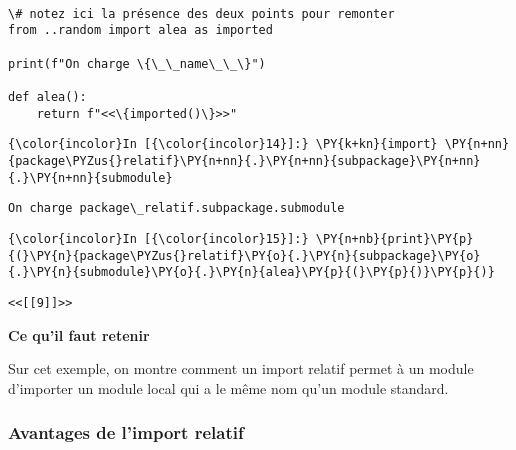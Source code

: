     \begin{Verbatim}[commandchars=\\\{\},frame=single,framerule=0.3mm,rulecolor=\color{cellframecolor}]

\# notez ici la présence des deux points pour remonter
from ..random import alea as imported

print(f"On charge \{\_\_name\_\_\}")

def alea():
    return f"<<\{imported()\}>>"
\end{Verbatim}

    \begin{Verbatim}[commandchars=\\\{\},frame=single,framerule=0.3mm,rulecolor=\color{cellframecolor}]
{\color{incolor}In [{\color{incolor}14}]:} \PY{k+kn}{import} \PY{n+nn}{package\PYZus{}relatif}\PY{n+nn}{.}\PY{n+nn}{subpackage}\PY{n+nn}{.}\PY{n+nn}{submodule}
\end{Verbatim}


    \begin{Verbatim}[commandchars=\\\{\},frame=single,framerule=0.3mm,rulecolor=\color{cellframecolor}]
On charge package\_relatif.subpackage.submodule
\end{Verbatim}

    \begin{Verbatim}[commandchars=\\\{\},frame=single,framerule=0.3mm,rulecolor=\color{cellframecolor}]
{\color{incolor}In [{\color{incolor}15}]:} \PY{n+nb}{print}\PY{p}{(}\PY{n}{package\PYZus{}relatif}\PY{o}{.}\PY{n}{subpackage}\PY{o}{.}\PY{n}{submodule}\PY{o}{.}\PY{n}{alea}\PY{p}{(}\PY{p}{)}\PY{p}{)}
\end{Verbatim}


    \begin{Verbatim}[commandchars=\\\{\},frame=single,framerule=0.3mm,rulecolor=\color{cellframecolor}]
<<[[9]]>>
\end{Verbatim}

    \textbf{Ce qu'il faut retenir}

Sur cet exemple, on montre comment un import relatif permet à un module
d'importer un module local qui a le même nom qu'un module standard.

    \hypertarget{avantages-de-limport-relatif}{%
\subsubsection{Avantages de l'import
relatif}\label{avantages-de-limport-relatif}}

